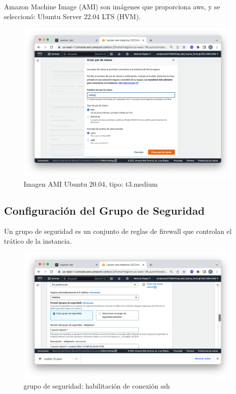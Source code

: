 Amazon Machine Image (AMI) son imágenes que proporciona aws, y se seleccionó: Ubuntu Server 22.04 LTS (HVM).

\begin{figure}[h]
	\centering
	\includegraphics[scale=.3] {img/03}
	\caption{Imagen AMI Ubuntu 20.04, tipo: t3.medium}
	\label{fig:3}	
\end{figure}

\subsection{Configuración del Grupo de Seguridad}
Un grupo de seguridad es un conjunto de reglas de firewall  que controlan el trático de la instancia.
\begin{figure}[h]
	\centering
	\includegraphics[scale=.35] {img/04}
	\caption{grupo de seguridad: habilitación de conexión ssh}
	\label{fig:4}	
\end{figure} 

